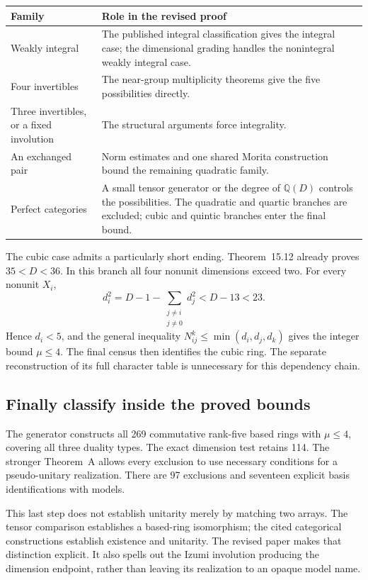 \documentclass[11pt,a4paper]{article}
\newcommand{\issue}[1]{\subsection{#1}}
\begin{document}
\begin{center}
\begin{tabularx}{\textwidth}{@{}p{}X@{}}
\toprule
Family & Role in the revised proof\\
\midrule
Weakly integral & The published integral classification gives the integral
case; the dimensional grading handles the nonintegral weakly integral case.\\
Four invertibles & The near-group multiplicity theorems give the five
possibilities directly.\\
Three invertibles, or a fixed involution & The structural arguments force
integrality.\\
An exchanged pair & Norm estimates and one shared Morita construction bound
the remaining quadratic family.\\
Perfect categories & A small tensor generator or the degree of
\(\mathbb Q(D)\) controls the possibilities. The quadratic and quartic
branches are excluded; cubic and quintic branches enter the final bound.\\
\bottomrule
\end{tabularx}
\end{center}

The cubic case admits a particularly short ending. Theorem~15.12 already
proves \(35<D<36\). In this branch all four nonunit dimensions exceed two.
For every nonunit \(X_i\),
\[
 d_i^2=D-1-\sum_{\substack{j\ne i\\j\ne0}}d_j^2<D-13<23.
\]
Hence \(d_i<5\), and the general inequality
\(N_{ij}^{k}\le\min(d_i,d_j,d_k)\) gives the integer bound \(\mu\le4\).
The final census then identifies the cubic ring. The separate reconstruction
of its full character table is unnecessary for this dependency chain.

\issue{Finally classify inside the proved bounds}

The generator constructs all 269 commutative rank-five based rings with
\(\mu\le4\), covering all three duality types. The exact dimension test
retains 114. The stronger Theorem~A allows every exclusion to use necessary
conditions for a pseudo-unitary realization. There are 97 exclusions and
seventeen explicit basis identifications with models.

This last step does not establish unitarity merely by matching two arrays.
The tensor comparison establishes a based-ring isomorphism; the cited
categorical constructions establish existence and unitarity. The revised
paper makes that distinction explicit. It also spells out the Izumi
involution producing the dimension endpoint, rather than leaving its
realization to an opaque model name.
\end{document}
